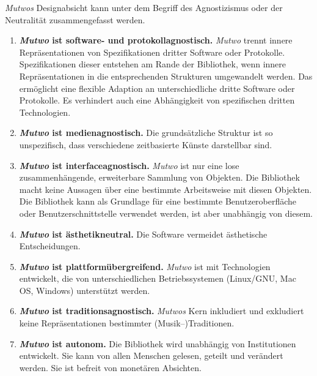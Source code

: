 \documentclass[12pt,a4paper,ngerman]{article}
\begin{document}
\bigskip

\emph{Mutwos} Designabsicht kann unter dem Begriff des Agnostizismus oder der Neutralität zusammengefasst werden.

\begin{enumerate}

    \item{
            \textbf{ \emph{Mutwo} ist software- und protokollagnostisch. }
            \emph{Mutwo} trennt innere Repräsentationen von Spezifikationen dritter Software oder Protokolle.
            Spezifikationen dieser entstehen am Rande der Bibliothek, wenn innere Repräsentationen in die entsprechenden Strukturen umgewandelt werden.
            Das ermöglicht eine flexible Adaption an unterschiedliche dritte Software oder Protokolle.
            Es verhindert auch eine Abhängigkeit von spezifischen dritten Technologien.
    }

    \item{
            \textbf{ \emph{Mutwo} ist medienagnostisch. }
            Die grundsätzliche Struktur ist so unspezifisch, dass verschiedene zeitbasierte Künste darstellbar sind.
    }

    \item{
            \textbf{ \emph{Mutwo} ist interfaceagnostisch. }
            \emph{Mutwo} ist nur eine lose zusammenhängende, erweiterbare Sammlung von Objekten.
            Die Bibliothek macht keine Aussagen über eine bestimmte Arbeitsweise mit diesen Objekten.
            Die Bibliothek kann als Grundlage für eine bestimmte Benutzeroberfläche oder Benutzerschnittstelle verwendet werden, ist aber unabhängig von diesem.
    }

    \item{
            \textbf{ \emph{Mutwo} ist ästhetikneutral. }
            Die Software vermeidet ästhetische Entscheidungen.
    }

    \item{
            \textbf{ \emph{Mutwo} ist plattformübergreifend. }
            \emph{Mutwo} ist mit Technologien entwickelt, die von unterschiedlichen Betriebssystemen (Linux/GNU, Mac OS, Windows) unterstützt werden.
    }

    \item{
            \textbf{ \emph{Mutwo} ist traditionsagnostisch. }
            \emph{Mutwos} Kern inkludiert und exkludiert keine Repräsentationen bestimmter (Musik--)Traditionen.
    }

    \item{
            \textbf{ \emph{Mutwo} ist autonom. }
            Die Bibliothek wird unabhängig von Institutionen entwickelt.
            Sie kann von allen Menschen gelesen, geteilt und verändert werden.
            Sie ist befreit von monetären Absichten.
    }

\end{enumerate}
\end{document}
